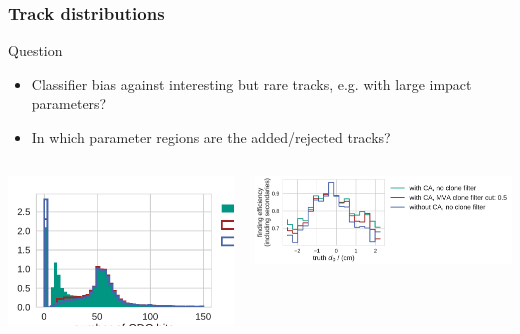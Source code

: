 \documentclass[18pt, aspectratio=169]{beamer}
\begin{document}
\begin{frame}
  \frametitle{Track distributions}
  \begin{block}{Question}
    \begin{itemize}
    \item Classifier bias against interesting but rare tracks, e.g. with large impact parameters?
    \item In which parameter regions are the added/rejected tracks?
    \end{itemize}
  \end{block}
  \begin{columns}
    \begin{column}{.5\textwidth}
      \includegraphics[width=1.0\textwidth]{figures/rejected_vs_other_track_distributions_by_found_n_cdc_hits_normed=False_scaleByEvents=True_fullreco.pdf}
    \end{column}
    \begin{column}{.5\textwidth}
      \includegraphics[width=1.0\textwidth]{figures/findeff_secondaries_by_d0_truth_fullreco.pdf}
    \end{column}
  \end{columns}  
\end{frame}
\end{document}
